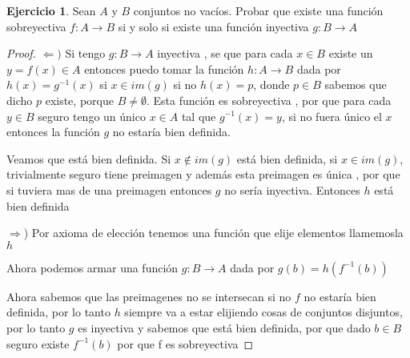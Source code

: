 \documentclass[12pt]{article}
\newcommand{\Ra}{\Rightarrow}
\newcommand{\ra}{\rightarrow}
\theoremstyle{definition}
\newtheorem{ej}{Ejercicio}
\begin{document}
\begin{ej}
	Sean $A$ y $B$ conjuntos no vacíos. Probar que existe una función sobreyectiva $f: A\ra B$ si y solo si existe una función inyectiva $g:B \ra A$

	\begin{proof}
		$\Leftarrow )$ Si tengo $g: B \ra A$ inyectiva , se que para cada $x \in B$ existe un $y = f(x) \in A$ entonces puedo tomar la función $h: A \ra B$ dada por $h(x) = g^{-1}(x)$ si $x \in im(g)$ si no $h(x) = p$, donde $p \in B$ sabemos que dicho $p$ existe, porque $B \neq \emptyset$. Esta función es sobreyectiva , por que para cada $y \in B$ seguro tengo un único $x \in A$ tal que $g^{-1}(x) = y$, si no fuera único el $x$ entonces la función $g$ no estaría bien definida.

		Veamos que está bien definida. Si $x \notin im(g)$ está bien definida, si $x \in im(g)$, trivialmente seguro tiene preimagen y además esta preimagen es única , por que si tuviera mas de una preimagen entonces $g$ no sería inyectiva. Entonces $h$ está bien definida

		$\Ra$) Por axioma de elección tenemos una función que elije elementos llamemosla $h$

		Ahora podemos armar una función $g: B \ra A$ dada por $g(b) = h ( f^{-1}(b)) $

		Ahora sabemos que las preimagenes no se intersecan si no $f$ no estaría bien definida, por lo tanto $h$ siempre va a estar elijiendo cosas de conjuntos disjuntos, por lo tanto $g$ es inyectiva y sabemos que está bien definida, por que dado $b \in B$ seguro existe $f^{-1}(b)$ por que f es sobreyectiva
	\end{proof}
	
	
\end{ej}
\end{document}
